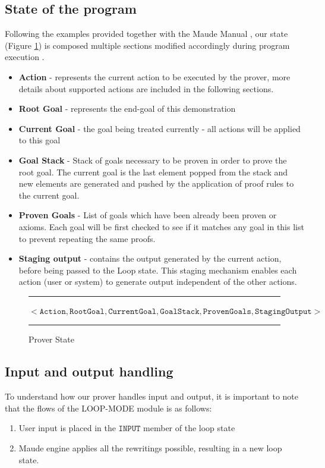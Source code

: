 \documentclass[12pt,a4paper]{article}
\begin{document}
{\subsection{State of the program}
Following the examples provided together with the Maude Manual \cite{manual}, our state (Figure \ref{fig:ProverState}) is composed multiple sections modified accordingly during program execution .
\begin{itemize}
	\item{\textbf{Action} - represents the current action to be executed by the prover, more details about supported actions are included in the following sections.}
	\item{\textbf{Root Goal} - represents the end-goal of this demonstration}
	\item{\textbf{Current Goal} - the goal being treated currently - all actions will be applied to this goal}
	\item{\textbf{Goal Stack} - Stack of goals necessary to be proven in order to prove the root goal. The current goal is the last element popped from the stack and new elements are generated and pushed by the application of proof rules to the current goal.}
	\item{\textbf{Proven Goals} - List of goals which have been already been proven or axioms. Each goal will be first checked to see if it matches any goal in this list to prevent repeating the same proofs.}
	\item{\textbf{Staging output} - contains the output generated by the current action, before being passed to the Loop state. This staging mechanism enables each action (user or system) to generate output independent of the other actions.}
\end{itemize}
\begin{figure}[h]
	\noindent\rule{\linewidth}{0.4pt}
	\(
	< \mathtt{Action}, \mathtt{Root Goal}, \mathtt{Current Goal}, \mathtt{Goal Stack}, \mathtt{Proven Goals}, \mathtt{Staging Output} >
	\)
	\caption{Prover State}
	\label{fig:ProverState}
	\noindent\rule{\linewidth}{0.4pt}
\end{figure}
\subsection{Input and output handling}
To understand how our prover handles input and output, it is important to note that the flows of the LOOP-MODE module is as follows: 
\begin{enumerate}
	\item User input is placed in the \(\mathtt{INPUT}\) member of the loop state
	\item Maude engine applies all the rewritings possible, resulting in a new loop state. 
	

\end{enumerate}}
\end{document}

